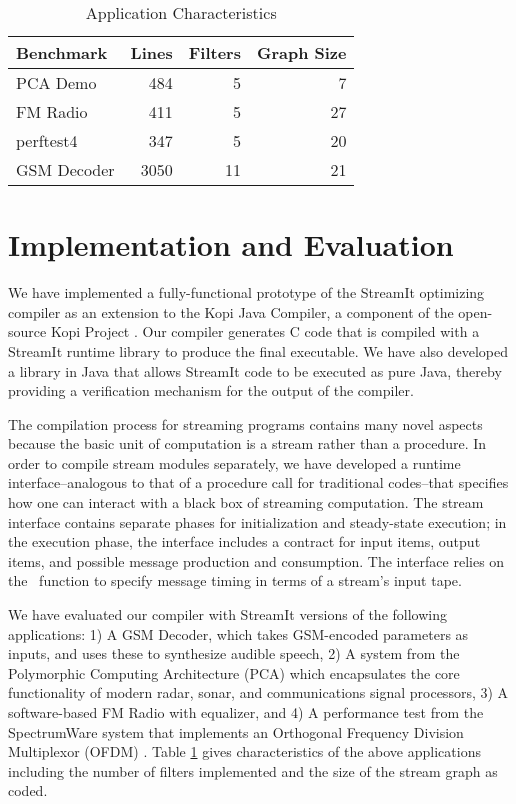 \begin{table}[t]
\begin{center}
\scriptsize
\begin{tabular}{|l|r|r|r|} \hline
Benchmark & Lines & Filters & Graph Size\\
\hline \hline
PCA Demo & 484 & 5 & 7\\
\hline
FM Radio & 411 & 5 & 27\\
\hline
perftest4 & 347 & 5 & 20\\
\hline
GSM Decoder & 3050 & 11 & 21 \\
\hline
\end{tabular}
\vspace{-6pt}
\caption{\protect\small Application Characteristics}
\label{tab:benchmarks}
\vspace{-12pt}
\end{center}
\end{table}

\section{Implementation and Evaluation}
\label{sec:results}

We have implemented a fully-functional prototype of the StreamIt
optimizing compiler as an extension to the Kopi Java Compiler, a
component of the open-source Kopi Project \cite{kopi}.  Our compiler
generates C code that is compiled with a StreamIt runtime library to
produce the final executable.  We have also developed a library in
Java that allows StreamIt code to be executed as pure Java, thereby
providing a verification mechanism for the output of the compiler.

The compilation process for streaming programs contains many novel
aspects because the basic unit of computation is a stream rather than
a procedure.  In order to compile stream modules separately, we have
developed a runtime interface--analogous to that of a procedure call
for traditional codes--that specifies how one can interact with a
black box of streaming computation.  The stream interface contains
separate phases for initialization and steady-state execution; in the
execution phase, the interface includes a contract for input items,
output items, and possible message production and consumption.  The
interface relies on the \sdep~function to specify message timing in
terms of a stream's input tape.

We have evaluated our compiler with StreamIt versions of the following
applications: 1) A GSM Decoder, which takes GSM-encoded parameters as
inputs, and uses these to synthesize audible speech, 2) A system from
the Polymorphic Computing Architecture (PCA) \cite{pca} which
encapsulates the core functionality of modern radar, sonar, and
communications signal processors, 3) A software-based FM Radio with
equalizer, and 4) A performance test from the SpectrumWare system that
implements an Orthogonal Frequency Division Multiplexor (OFDM)
\cite{spectrumware}.  Table \ref{tab:benchmarks} gives characteristics
of the above applications including the number of filters implemented
and the size of the stream graph as coded.

